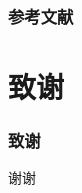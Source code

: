 \documentclass[UTF8]{beamer}
\begin{document}
\begin{frame}
    \frametitle{参考文献}
    
\end{frame}

\section*{致谢}
\begin{frame}
    \frametitle{致谢}
    \begin{center}
        \Huge 谢谢
    \end{center}
\end{frame}
\end{document}

